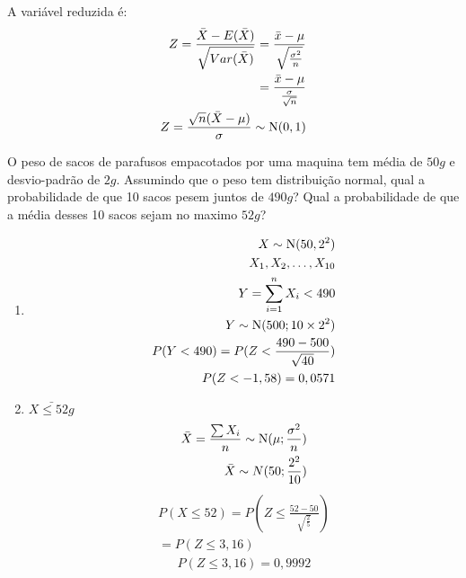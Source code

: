 \begin{description}
  A variável reduzida é:
  \begin{align*}
    Z = \frac{\bar{X}- E(\bar{X})}{\sqrt{Var(\bar{X})}} = \frac{\bar{x} - \mu}{\sqrt{\frac{\sigma^2}{n}}} \\
    = \frac{\bar{x}- \mu}{\frac{\sigma}{\sqrt{n}}} \\
    Z= \frac{\sqrt{n} (\bar{X} -\mu)}{\sigma} \sim \operatorname{N} (0,1)
  \end{align*}
  \begin{example}O peso de sacos de parafusos empacotados por uma maquina tem média de $50g$ e desvio-padrão de $2g$.
    Assumindo que  o peso tem distribuição normal, qual a probabilidade de que 10 sacos pesem juntos de $490g$? 
    Qual a probabilidade de que a média desses 10 sacos sejam no maximo $52g$?

    \begin{enumerate}[label=(\alph*)]
      \item
        \begin{align*}
          X \sim \operatorname{N}(50, 2^2) \\
          X_1, X_2, \ldots , X_{10 } \\
          Y= \sum_{i=1}^{n} X_i < 490 \\
          Y \sim \operatorname{N}(500 ; 10 \times 2^2) \\
          P(Y <490 ) = P(Z < \frac{490-500}{\sqrt{40}}) \\
          P(Z< -1,58) = 0,0571
        \end{align*}

      \item $\bar{X \leq 52g}$
        \begin{align*}
          \bar{X}  = \frac{\sum X_{i}}{n} \sim \operatorname{N}(\mu ; \frac{\sigma^2}{n}) \\
          \bar{X} \sim N(50; \frac{2^2}{10})
        \end{align*}
        \begin{align*}
          P(X \leq 52)  = P(Z \leq \frac{52-50}{\sqrt{\frac{2}{5}}}) \\
          = P(Z \leq 3,16)
        \end{align*}
        \begin{align*}
          P(Z \leq 3,16 ) = 0,9992
        \end{align*}
    \end{enumerate}
\end{example}
\end{description}
